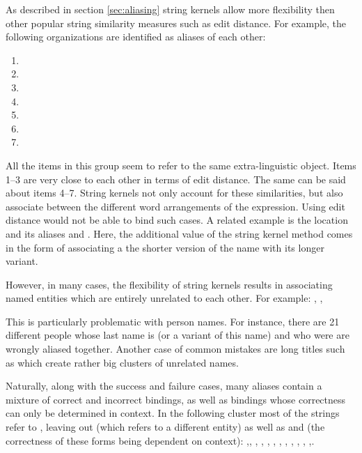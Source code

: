 As described in section \ref{sec:aliasing} string kernels allow more flexibility then other popular string similarity measures such as edit distance.
For example, the following organizations are identified as aliases of each other:
\begin{enumerate}
\item  {}
\item  {}
\item  {}
\item  {}
\item  {}
\item  {}
\item  {}
\end{enumerate}
All the items in this group seem to refer to the same extra-linguistic object. Items 1--3 are very close to each other in terms of edit distance.
The same can be said about items 4--7. String kernels not only account for these similarities, but also associate between the different word arrangements of the expression. Using edit distance would not be able to bind such cases. A related example is the location  and its aliases 
 and . Here, the additional value of the string kernel method comes in the form of associating a the shorter version of the
name with its longer variant. 

However, in many cases, the flexibility of string kernels results in associating named entities which are entirely unrelated to each other. For example: , , 

This is particularly problematic with person names. For instance, there are 21 different people whose last name is  (or a variant of this name) and who were are wrongly aliased together. Another case of common mistakes are long titles such as  which create rather big clusters of unrelated names.   
 
Naturally, along with the success and failure cases, many aliases contain a mixture of correct and incorrect bindings, as well as bindings whose correctness can only be determined in context. In the following cluster most of the strings refer to , leaving out  (which refers to a different entity) as well as  and  (the correctness of these forms being dependent on context): ,, , , , , , , , , , ,.

